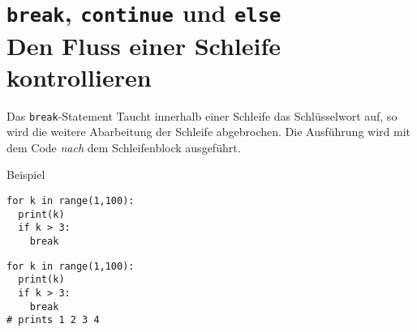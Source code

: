 \section{\texttt{break}, \texttt{continue} und \texttt{else} \\ \footnotesize Den Fluss einer Schleife kontrollieren}


\begin{fragile}
	

\begin{block}{Das \texttt{break}-Statement}
Taucht innerhalb einer Schleife das Schlüsselwort  auf, so wird die weitere Abarbeitung der Schleife abgebrochen. Die Ausführung wird mit dem Code \emph{nach} dem Schleifenblock ausgeführt. 		
\end{block}


\vspace{12pt} \pause 


\begin{exampleblock}{Beispiel}
\vspace{2pt}

\begin{overprint}
\begin{verbatim}
for k in range(1,100):
  print(k)
  if k > 3:
    break
\end{verbatim}
\begin{verbatim}
for k in range(1,100):
  print(k)
  if k > 3:
    break
# prints 1 2 3 4 
\end{verbatim}
\end{overprint}

\end{exampleblock}

	
\end{fragile}



